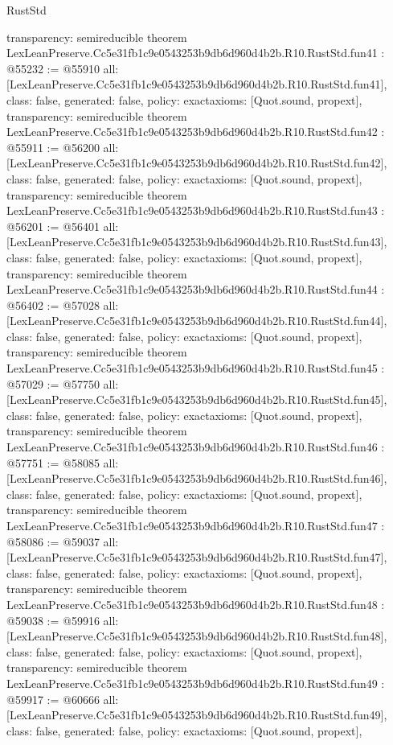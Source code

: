 \begin{lexlean}{RustStd}
\begin{coremodule}
{  transparency: semireducible
}
theorem LexLeanPreserve.Cc5e31fb1c9e0543253b9db6d960d4b2b.R10.RustStd.fun41 : @55232 := @55910 {
  all: [LexLeanPreserve.Cc5e31fb1c9e0543253b9db6d960d4b2b.R10.RustStd.fun41],
  class: false,
  generated: false,
  policy: exact{axioms: [Quot.sound, propext]},
  transparency: semireducible
}
theorem LexLeanPreserve.Cc5e31fb1c9e0543253b9db6d960d4b2b.R10.RustStd.fun42 : @55911 := @56200 {
  all: [LexLeanPreserve.Cc5e31fb1c9e0543253b9db6d960d4b2b.R10.RustStd.fun42],
  class: false,
  generated: false,
  policy: exact{axioms: [Quot.sound, propext]},
  transparency: semireducible
}
theorem LexLeanPreserve.Cc5e31fb1c9e0543253b9db6d960d4b2b.R10.RustStd.fun43 : @56201 := @56401 {
  all: [LexLeanPreserve.Cc5e31fb1c9e0543253b9db6d960d4b2b.R10.RustStd.fun43],
  class: false,
  generated: false,
  policy: exact{axioms: [Quot.sound, propext]},
  transparency: semireducible
}
theorem LexLeanPreserve.Cc5e31fb1c9e0543253b9db6d960d4b2b.R10.RustStd.fun44 : @56402 := @57028 {
  all: [LexLeanPreserve.Cc5e31fb1c9e0543253b9db6d960d4b2b.R10.RustStd.fun44],
  class: false,
  generated: false,
  policy: exact{axioms: [Quot.sound, propext]},
  transparency: semireducible
}
theorem LexLeanPreserve.Cc5e31fb1c9e0543253b9db6d960d4b2b.R10.RustStd.fun45 : @57029 := @57750 {
  all: [LexLeanPreserve.Cc5e31fb1c9e0543253b9db6d960d4b2b.R10.RustStd.fun45],
  class: false,
  generated: false,
  policy: exact{axioms: [Quot.sound, propext]},
  transparency: semireducible
}
theorem LexLeanPreserve.Cc5e31fb1c9e0543253b9db6d960d4b2b.R10.RustStd.fun46 : @57751 := @58085 {
  all: [LexLeanPreserve.Cc5e31fb1c9e0543253b9db6d960d4b2b.R10.RustStd.fun46],
  class: false,
  generated: false,
  policy: exact{axioms: [Quot.sound, propext]},
  transparency: semireducible
}
theorem LexLeanPreserve.Cc5e31fb1c9e0543253b9db6d960d4b2b.R10.RustStd.fun47 : @58086 := @59037 {
  all: [LexLeanPreserve.Cc5e31fb1c9e0543253b9db6d960d4b2b.R10.RustStd.fun47],
  class: false,
  generated: false,
  policy: exact{axioms: [Quot.sound, propext]},
  transparency: semireducible
}
theorem LexLeanPreserve.Cc5e31fb1c9e0543253b9db6d960d4b2b.R10.RustStd.fun48 : @59038 := @59916 {
  all: [LexLeanPreserve.Cc5e31fb1c9e0543253b9db6d960d4b2b.R10.RustStd.fun48],
  class: false,
  generated: false,
  policy: exact{axioms: [Quot.sound, propext]},
  transparency: semireducible
}
theorem LexLeanPreserve.Cc5e31fb1c9e0543253b9db6d960d4b2b.R10.RustStd.fun49 : @59917 := @60666 {
  all: [LexLeanPreserve.Cc5e31fb1c9e0543253b9db6d960d4b2b.R10.RustStd.fun49],
  class: false,
  generated: false,
  policy: exact{axioms: [Quot.sound, propext]},
}
\end{coremodule}
\end{lexlean}

